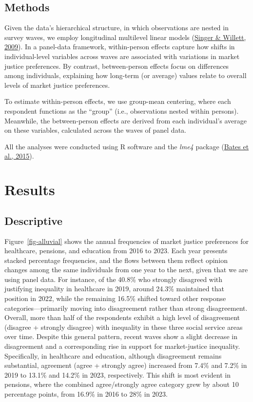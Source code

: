 \documentclass[
  12pt,
]{article}
\begin{document}
\hypertarget{methods}{%
\subsection{Methods}\label{methods}}

Given the data's hierarchical structure, in which observations are
nested in survey waves, we employ longitudinal multilevel linear models
(\protect\hyperlink{ref-singer_applied_2009}{Singer \& Willett, 2009}).
In a panel-data framework, within-person effects capture how shifts in
individual-level variables across waves are associated with variations
in market justice preferences. By contrast, between-person effects focus
on differences among individuals, explaining how long-term (or average)
values relate to overall levels of market justice preferences.

To estimate within-person effects, we use group-mean centering, where
each respondent functions as the ``group'' (i.e., observations nested
within persons). Meanwhile, the between-person effects are derived from
each individual's average on these variables, calculated across the
waves of panel data.

All the analyses were conducted using R software and the \emph{lme4}
package (\protect\hyperlink{ref-bates_fitting_2015}{Bates et al.,
2015}).

\hypertarget{results}{%
\section{Results}\label{results}}

\hypertarget{descriptive}{%
\subsection{Descriptive}\label{descriptive}}

Figure~\ref{fig-alluvial} shows the annual frequencies of market justice
preferences for healthcare, pensions, and education from 2016 to 2023.
Each year presents stacked percentage frequencies, and the flows between
them reflect opinion changes among the same individuals from one year to
the next, given that we are using panel data. For instance, of the
40.8\% who strongly disagreed with justifying inequality in healthcare
in 2019, around 24.3\% maintained that position in 2022, while the
remaining 16.5\% shifted toward other response categories---primarily
moving into disagreement rather than strong disagreement. Overall, more
than half of the respondents exhibit a high level of disagreement
(disagree + strongly disagree) with inequality in these three social
service areas over time. Despite this general pattern, recent waves show
a slight decrease in disagreement and a corresponding rise in support
for market-justice inequality. Specifically, in healthcare and
education, although disagreement remains substantial, agreement (agree +
strongly agree) increased from 7.4\% and 7.2\% in 2019 to 13.1\% and
14.2\% in 2023, respectively. This shift is most evident in pensions,
where the combined agree/strongly agree category grew by about 10
percentage points, from 16.9\% in 2016 to 28\% in 2023.
\end{document}
